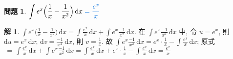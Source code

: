 \documentclass[12pt]{extarticle}
\newcommand{\ds}{\displaystyle}
\theoremstyle{definition}
\newtheorem*{ex}{問題}
\newtheorem*{sol}{解}
\begin{document}
\begin{ex}
  $\ds\int e^x\Big(\frac{1}{x} - \frac{1}{x^2}\Big)\,\text{d}x{\color{C2}\;= \frac{e^x}{x}}$
\end{ex}

\begin{sol}
  $\ds\int e^x\Big(\frac{1}{x} - \frac{1}{x^2}\Big)\,\text{d}x = \int\!\frac{e^x}{x}\,\text{d}x + \int\!e^x\frac{-1}{x^2}\,\text{d}x$. 在 $\ds\int e^x\frac{-1}{x^2}\,\text{d}x$ 中, 令 $\ds u = e^x$, 則 $\ds\text{d}u = e^x\,\text{d}x$; $\ds\text{d}v = \frac{-1}{x^2}\,\text{d}x$, 則 $\ds v = \frac{1}{x}$. 故 $\ds\int e^x\frac{-1}{x^2}\,\text{d}x = e^x\cdot\frac{1}{x} - \int\!\frac{e^x}{x}\,\text{d}x$; 原式$\ds\,=\,\int\!\frac{e^x}{x}\,\text{d}x + \int\!e^x\frac{-1}{x^2}\,\text{d}x = \int\!\frac{e^x}{x}\,\text{d}x + e^x\cdot\frac{1}{x} - \int\!\frac{e^x}{x}\,\text{d}x = \frac{e^{x}}{x}$
\end{sol}
\end{document}
